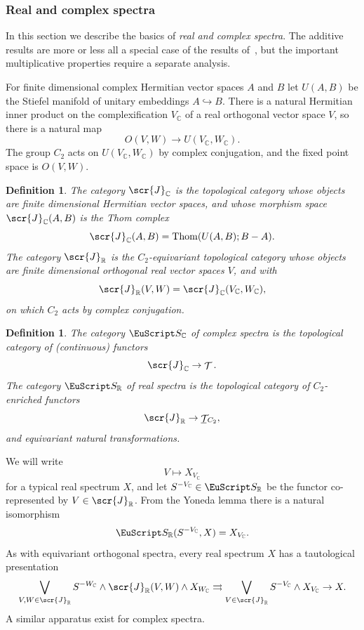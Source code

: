 \documentclass{amsart}
\newtheorem{definition}[equation]{Definition}
\newenvironment{defin}{\begin{definition}\rm}{\end{definition}}
\theoremstyle{definition}
\newtheorem{defin}[equation]{Definition}
\theoremstyle{remark}
\newcommand{\R}{{\mathbb R}}
\newcommand{\C}{\mathbb C}
\newcommand{\spectra}{\EuScript S}
\DeclareMathOperator{\spaces}{\mathcal T}
\DeclareMathOperator{\thom}{Thom}
\newcommand{\icat}{\scr{J}}
\newcommand{\gspaces}[1]{\underline{\spaces\mkern-4mu}\mkern4mu_{\!#1}}
\newcommand{\spectrar}{\spectra_{\R}}
\newcommand{\zt}{C_{2}}
\newcommand{\icatr}{\icat_{\R}}
\newcommand{\icatc}{\icat_{\C}}
\newcommand{\rspectra}{\spectra_{\R}}
\newcommand{\cspectra}{\spectra_{\C}}
\begin{document}
\subsubsection{Real and complex spectra}

In this section we describe the basics of {\em real and complex
spectra}.  The additive results are more or less all a special case of
the results of~\cite{MR1806878}, but the important multiplicative
properties require a separate analysis.

For finite dimensional complex Hermitian vector spaces $A$ and $B$ let
$U(A,B)$ be the Stiefel manifold of unitary embeddings
$A\hookrightarrow B$.  There is a natural Hermitian inner product on
the complexification $V_{\C}$ of a real orthogonal vector space $V$,
so there is a natural map
\[
O(V,W)\to U(V_{\C},W_{\C}).  
\]
The group $\zt$ acts on $U(V_{\C},W_{\C})$ by complex conjugation, and
the fixed point space is $O(V,W)$.

\begin{defin}
\label{def:22} 
The category $\icatc$ is the 
topological category whose objects are finite dimensional Hermitian
vector spaces, and whose morphism space $\icatc(A,B)$ is the
Thom complex
\[
\icatc(A,B) = \thom(U(A,B); B-A).
\]
The category $\icatr$ is the $\zt$-equivariant
topological category whose objects are finite dimensional orthogonal
real vector spaces $V$, and with
\[
\icatr(V,W) = \icatc(V_{\C},W_{\C}),
\]
on which $\zt$ acts by complex conjugation.
\end{defin}


\begin{defin}
\label{def:51} 
The category $\cspectra$ of {\em complex spectra} is the topological
category of (continuous) functors
\[
\icatc\to\spaces. 
\]
The category $\rspectra$ of {\em real spectra} is the
topological category of $\zt$-enriched functors
\[
\icatr\to\gspaces{\zt},
\]
and equivariant natural transformations.   
\end{defin}

We will write 
\[
V\mapsto X_{V_{\C}}
\]
for a typical real spectrum $X$, and let $S^{-V_{\C}}\in\spectrar$ be
the functor co-represented by $V\in\icatr$.  From the Yoneda lemma
there is a natural isomorphism
\[
\rspectra(S^{-V_{\C}},X) = X_{V_{\C}}.
\]
As with equivariant orthogonal spectra, every real
spectrum $X$ has a tautological presentation
\begin{equation}
\label{eq:78}
\bigvee_{V,W\in\icatr}S^{-W_{\C}}\wedge \icatr(V,W)\wedge X_{W_{\C}}
\rightrightarrows \bigvee_{V\in\icatr} S^{-V_{\C}}\wedge X_{V_{\C}} \to X.
\end{equation}
A similar apparatus exist for complex spectra.
\end{document}
